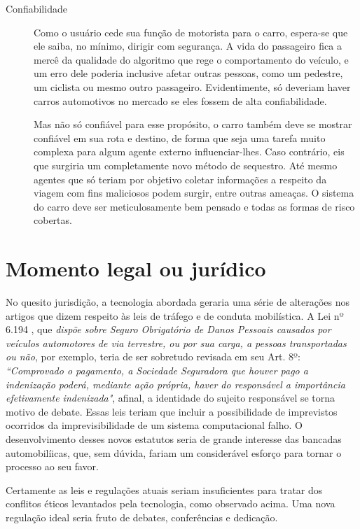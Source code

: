 \documentclass[12pt]{article}
\begin{document}
\begin{description}
			\item [Confiabilidade] Como o usuário cede sua função de motorista para o carro, espera-se que ele saiba, no mínimo, dirigir com segurança. A vida do passageiro fica a mercê da qualidade do algoritmo que rege o comportamento do veículo, e um erro dele poderia inclusive afetar outras pessoas, como um pedestre, um ciclista ou mesmo outro passageiro. Evidentimente, só deveriam haver carros automotivos no mercado se eles fossem de alta confiabilidade.
			
			Mas não só confiável para esse propósito, o carro também deve se mostrar confiável em sua rota e destino, de forma que seja uma tarefa muito complexa para algum agente externo influenciar-lhes. Caso contrário, eis que surgiria um completamente novo método de sequestro. Até mesmo agentes que só teriam por objetivo coletar informações a respeito da viagem com fins maliciosos podem surgir, entre outras ameaças. O sistema do carro deve ser meticulosamente bem pensado e todas as formas de risco cobertas.
			
		\end{description}
		
	\section{\label{legal}Momento legal ou jurídico}
	
		No quesito jurisdição, a tecnologia abordada geraria uma série de alterações nos artigos que dizem respeito às leis de tráfego e de conduta mobilística. A Lei nº 6.194 \citep{congresso_nacional_lei_1974}, que \emph{dispõe sobre Seguro Obrigatório de Danos Pessoais causados por veículos automotores de via terrestre, ou por sua carga, a pessoas transportadas ou não}, por exemplo, teria de ser sobretudo revisada em seu Art. 8º: \emph{``Comprovado o pagamento, a Sociedade Seguradora que houver pago a indenização poderá, mediante ação própria, haver do responsável a importância efetivamente indenizada"}, afinal, a identidade do sujeito responsável se torna motivo de debate.  Essas leis teriam que incluir a possibilidade de imprevistos ocorridos da imprevisibilidade de um sistema computacional falho. O desenvolvimento desses novos estatutos seria de grande interesse das bancadas automobilíicas, que, sem dúvida, fariam um considerável esforço para tornar o processo ao seu favor.
		
		Certamente as leis e regulações atuais seriam insuficientes para tratar dos conflitos éticos levantados pela tecnologia, como observado acima. Uma nova regulação ideal seria fruto de debates, conferências e dedicação.
		
\end{document}
